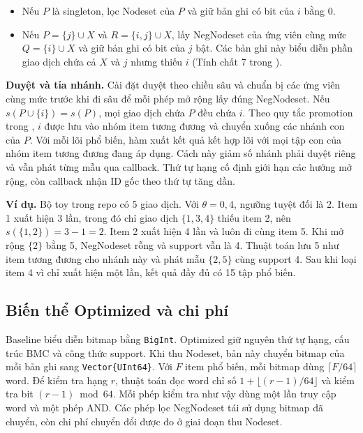 \begin{itemize}
\tightlist
\item
  Nếu \(P\) là singleton, lọc Nodeset của \(P\) và giữ bản ghi có bit của \(i\) bằng 0.
\item
  Nếu \(P=\{j\}\cup X\) và \(R=\{i,j\}\cup X\), lấy NegNodeset của ứng viên cùng mức \(Q=\{i\}\cup X\) và giữ bản ghi có bit của \(j\) bật. Các bản ghi này biểu diễn phần giao dịch chứa cả \(X\) và \(j\) nhưng thiếu \(i\) (Tính chất 7 trong \cite{negfin}).
\end{itemize}

\textbf{Duyệt và tỉa nhánh.} Cài đặt duyệt theo chiều sâu và chuẩn bị các ứng viên cùng mức trước khi đi sâu để mỗi phép mở rộng lấy đúng NegNodeset. Nếu \(s(P\cup\{i\})=s(P)\), mọi giao dịch chứa \(P\) đều chứa \(i\). Theo quy tắc promotion trong \cite{negfin}, \(i\) được lưu vào nhóm item tương đương và chuyển xuống các nhánh con của \(P\). Với mỗi lõi phổ biến, hàm xuất kết quả kết hợp lõi với mọi tập con của nhóm item tương đương đang áp dụng. Cách này giảm số nhánh phải duyệt riêng và vẫn phát từng mẫu qua callback. Thứ tự hạng cố định giới hạn các hướng mở rộng, còn callback nhận ID gốc theo thứ tự tăng dần.

\textbf{Ví dụ.} Bộ toy trong repo có 5 giao dịch. Với \(\theta=0{,}4\), ngưỡng tuyệt đối là 2. Item 1 xuất hiện 3 lần, trong đó chỉ giao dịch \(\{1,3,4\}\) thiếu item 2, nên \(s(\{1,2\})=3-1=2\). Item 2 xuất hiện 4 lần và luôn đi cùng item 5. Khi mở rộng \(\{2\}\) bằng 5, NegNodeset rỗng và support vẫn là 4. Thuật toán lưu 5 như item tương đương cho nhánh này và phát mẫu \(\{2,5\}\) cùng support 4. Sau khi loại item 4 vì chỉ xuất hiện một lần, kết quả đầy đủ có 15 tập phổ biến.

\subsection{Biến thể Optimized và chi phí}

Baseline biểu diễn bitmap bằng \texttt{BigInt}. Optimized giữ nguyên thứ tự hạng, cấu trúc BMC và công thức support. Khi thu Nodeset, bản này chuyển bitmap của mỗi bản ghi sang \texttt{Vector\{UInt64\}}. Với \(F\) item phổ biến, mỗi bitmap dùng \(\lceil F/64\rceil\) word. Để kiểm tra hạng \(r\), thuật toán đọc word chỉ số \(1+\lfloor(r-1)/64\rfloor\) và kiểm tra bit \((r-1)\bmod 64\). Mỗi phép kiểm tra như vậy dùng một lần truy cập word và một phép AND. Các phép lọc NegNodeset tái sử dụng bitmap đã chuyển, còn chi phí chuyển đổi được đo ở giai đoạn thu Nodeset.


